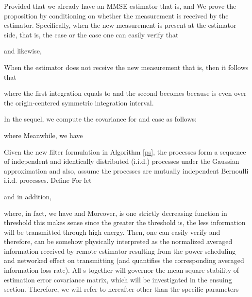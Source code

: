 \documentclass[journal]{IEEEtran}
\begin{document}
\begin{IEEEproof}
Provided that we already have an MMSE estimator  that is,  and  We prove the proposition by conditioning on whether the measurement is received by the estimator. Specifically, when the new measurement  is present at the estimator side, that is,  the case  or the case  one can easily verify that

and likewise,


When the estimator does not receive the new measurement  that is,  then it follows that

{}where the first integration equals to  and the second becomes  because  is even over the origin-centered symmetric integration interval.

In the sequel, we compute the covariance  for  and  case as follows:

where {} Meanwhile, we have

{}

\end{IEEEproof}


Given the new filter formulation in Algorithm \ref{ps}, the processes   form a sequence of independent and identically distributed (i.i.d.) processes under the Gaussian approximation \cite{tsp2012you} and also, assume the processes   are mutually independent Bernoulli i.i.d. processes. Define  For  let

and  in addition,

{\color{black}where, in fact, we have  and  Moreover,  is one strictly decreasing function in threshold  this makes sense since the greater the threshold is, the less information will be transmitted through high energy. Then, one can easily verify  and therefore,  can be somehow physically interpreted as the normalized averaged information received by remote estimator resulting from the power scheduling and networked effect on transmitting  (and  quantifies the corresponding averaged information loss rate). All s together will governor the mean square stability of estimation error covariance matrix, which will be investigated in the ensuing section. Therefore, we will refer to  hereafter other than the specific parameters }
\end{document}
